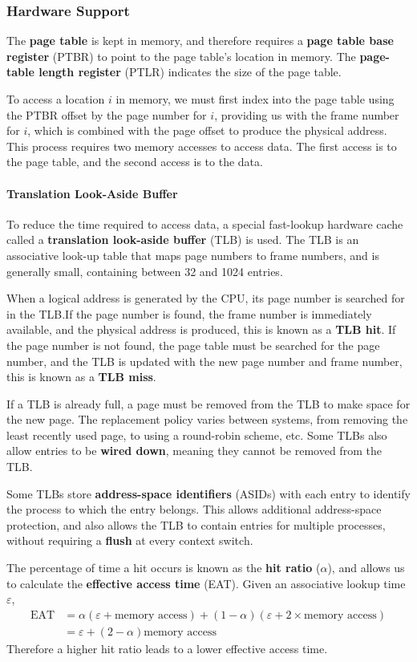 \documentclass{article}
\begin{document}
\subsubsection{Hardware Support}
The \textbf{page table} is kept in memory, and therefore requires a
\textbf{page table base register} (PTBR) to point to the page table's
location in memory. The \textbf{page-table length register} (PTLR)
indicates the size of the page table.

To access a location \(i\) in memory, we must first index into the page
table using the PTBR offset by the page number for \(i\), providing us
with the frame number for \(i\), which is combined with the page offset
to produce the physical address. This process requires two memory
accesses to access data. The first access is to the page table, and the
second access is to the data.
\paragraph{Translation Look-Aside Buffer}
To reduce the time required to access data, a special fast-lookup
hardware cache called a \textbf{translation look-aside buffer} (TLB) is
used. The TLB is an associative look-up table that maps page numbers to
frame numbers, and is generally small, containing between 32 and 1024
entries.

When a logical address is generated by the CPU, its page number is
searched for in the TLB.\@ If the page number is found, the frame
number is immediately available, and the physical address is produced,
this is known as a \textbf{TLB hit}. If the page number is not found,
the page table must be searched for the page number, and the TLB is
updated with the new page number and frame number, this is known as a
\textbf{TLB miss}.

If a TLB is already full, a page must be removed from the TLB to make
space for the new page. The replacement policy varies between systems,
from removing the least recently used page, to using a round-robin
scheme, etc. Some TLBs also allow entries to be \textbf{wired down},
meaning they cannot be removed from the TLB.\@

Some TLBs store \textbf{address-space identifiers} (ASIDs) with each
entry to identify the process to which the entry belongs. This allows
additional address-space protection, and also allows the TLB to contain
entries for multiple processes, without requiring a \textbf{flush} at
every context switch.

The percentage of time a hit occurs is known as the \textbf{hit ratio}
(\(\alpha\)), and allows us to calculate the \textbf{effective access
time} (EAT). Given an associative lookup time \(\varepsilon\),
\begin{align*}
    \text{EAT} & = \alpha \left( \varepsilon + \text{memory access} \right) + \left( 1 - \alpha \right) \left( \varepsilon + 2\times\text{memory access} \right) \\
               & = \varepsilon + \left( 2 - \alpha \right) \text{memory access}
\end{align*}
Therefore a higher hit ratio leads to a lower effective access time.
\end{document}
